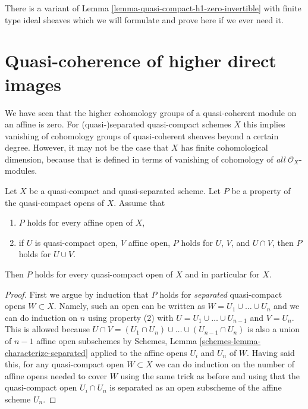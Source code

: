 \noindent
There is a variant of Lemma \ref{lemma-quasi-compact-h1-zero-invertible}
with finite type ideal sheaves which we will formulate and prove here if
we ever need it.












\section{Quasi-coherence of higher direct images}
\label{section-quasi-coherence}

\noindent
We have seen that the higher cohomology groups of a quasi-coherent module on
an affine is zero. For (quasi-)separated quasi-compact schemes $X$ this implies
vanishing of cohomology groups of quasi-coherent sheaves beyond a certain
degree. However, it may not be the case that $X$ has finite cohomological
dimension, because that is defined in terms of vanishing of cohomology
of {\it all} $\mathcal{O}_X$-modules.

\begin{lemma}
\label{lemma-induction-principle}
Let $X$ be a quasi-compact and quasi-separated scheme. Let $P$ be a property
of the quasi-compact opens of $X$. Assume that
\begin{enumerate}
\item $P$ holds for every affine open of $X$,
\item if $U$ is quasi-compact open, $V$ affine open,
$P$ holds for $U$, $V$, and $U \cap V$, then
$P$ holds for $U \cup V$.
\end{enumerate}
Then $P$ holds for every quasi-compact open of $X$
and in particular for $X$.
\end{lemma}

\begin{proof}
First we argue by induction that $P$ holds for {\it separated} quasi-compact
opens $W \subset X$. Namely, such an open can be written as
$W = U_1 \cup \ldots \cup U_n$ and we can do induction on $n$ using
property (2) with $U = U_1 \cup \ldots \cup U_{n - 1}$ and $V = U_n$.
This is allowed because
$U \cap V = (U_1 \cap U_n) \cup \ldots \cup (U_{n - 1} \cap U_n)$
is also a union of $n - 1$ affine open subschemes by
Schemes, Lemma \ref{schemes-lemma-characterize-separated}
applied to the affine opens $U_i$ and $U_n$ of $W$.
Having said this, for any quasi-compact open $W \subset X$ we can
do induction on the number of affine opens needed to cover $W$
using the same trick as before and using that the quasi-compact open
$U_i \cap U_n$ is separated as an open subscheme of the affine scheme $U_n$.
\end{proof}

